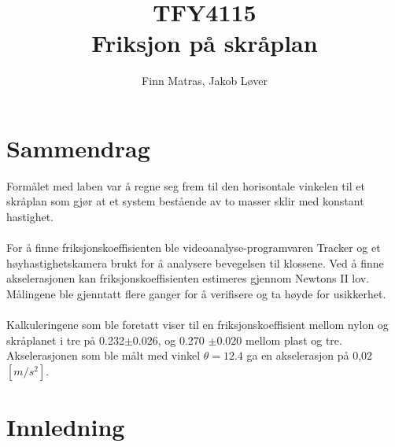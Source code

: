 \documentclass[10pt,a4paper]{report}
\author{Finn Matras, Jakob Løver}
\title{{\LARGE TFY4115}\\{\large Friksjon på skråplan}}
\begin{document}
\renewcommand{\contentsname}{Innhold}
\renewcommand{\cftchapleader}{\cftdotfill{\cftdotsep}}
\renewcommand{\cftpartleader}{\cftdotfill{\cftdotsep}}

\maketitle
\tableofcontents

\chapter*{Sammendrag}
Formålet med laben var å regne seg frem til den horisontale vinkelen til et skråplan som gjør at et system bestående av to masser sklir med konstant hastighet.\\
\\For å finne friksjonskoeffisienten ble videoanalyse-programvaren Tracker og et høyhastighetskamera brukt for å analysere bevegelsen til klossene. Ved å finne akselerasjonen kan friksjonskoeffisienten estimeres gjennom Newtons II lov. Målingene ble gjenntatt flere ganger for å verifisere og ta høyde for usikkerhet.\\
\\Kalkuleringene som ble foretatt viser til en friksjonskoeffisient mellom nylon og skråplanet i tre på 0.232$\pm 0.026$, og 0.270 $\pm 0.020$ mellom plast og tre. Akselerasjonen som ble målt med vinkel $\theta = 12.4$ ga en akselerasjon på 0,02 $[m/s^2]$.



{\let\clearpage\relax\chapter*{Innledning}}
\end{document}
